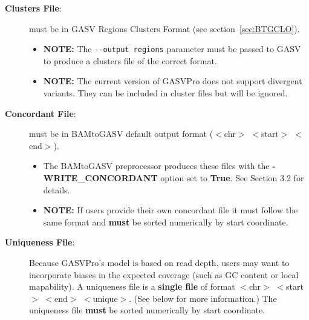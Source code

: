 \documentclass[11pt]{article}
\begin{document}
\begin{description}
\item[{\bf Clusters File}:] must be in GASV Regions Clusters Format (see section~\ref{sec:BTGCLO}). 
\begin{itemize}
\item {\bf NOTE:} The \verb+--output regions+ parameter must be passed to GASV to produce a clusters file of the correct format. 
\item {\bf NOTE:} The current version of GASVPro does not support divergent variants. They can be included in cluster files but will be ignored. 
\end{itemize}
\item[{\bf Concordant File}:]  must be in BAMtoGASV default output format ($<$chr$>$ $<$start$>$ $<$end$>$). 
\begin{itemize}
\item The BAMtoGASV preprocessor produces these files with the {\bf-WRITE\_CONCORDANT} option set to {\bf True}. See Section 3.2 for details. 
\item {\bf NOTE:} If users provide their own concordant file it must follow the same format and {\bf must} be sorted numerically by start coordinate.
\end{itemize}
\item[{\bf Uniqueness File}:]  Because GASVPro's model is based on read depth, users may want to incorporate biases in the expected coverage (such as GC content or local mapability). A uniqueness file is a {\bf single file} of format $<$chr$>$ $<$start$>$ $<$end$>$ $<$unique$>$. (See below for more information.) The uniqueness file {\bf must} be sorted numerically by start coordinate.
\end{description}
\end{document}
